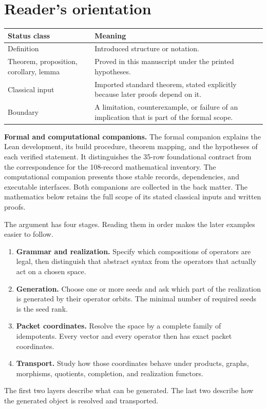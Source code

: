 \section*{Reader's orientation}
\begin{center}
\begin{tabularx}{0.96\textwidth}{@{}lY@{}}
\toprule
\textbf{Status class} & \textbf{Meaning}\\
\midrule
Definition & Introduced structure or notation.\\
Theorem, proposition, corollary, lemma & Proved in this manuscript under the printed hypotheses.\\
Classical input & Imported standard theorem, stated explicitly because later proofs depend on it.\\
Boundary & A limitation, counterexample, or failure of an implication that is part of the formal scope.\\
\bottomrule
\end{tabularx}
\end{center}

\noindent\textbf{Formal and computational companions.} The formal companion explains the Lean development, its build procedure, theorem mapping, and the hypotheses of each verified statement. It distinguishes the 35-row foundational contract from the correspondence for the 108-record mathematical inventory. The computational companion presents those stable records, dependencies, and executable interfaces. Both companions are collected in the back matter. The mathematics below retains the full scope of its stated classical inputs and written proofs.


\begin{readerroadmap}
The argument has four stages. Reading them in order makes the later examples easier to follow.
\begin{enumerate}
\item \textbf{Grammar and realization.}  Specify which compositions of operators are legal, then distinguish that abstract syntax from the operators that actually act on a chosen space.
\item \textbf{Generation.}  Choose one or more seeds and ask which part of the realization is generated by their operator orbits.  The minimal number of required seeds is the seed rank.
\item \textbf{Packet coordinates.}  Resolve the space by a complete family of idempotents.  Every vector and every operator then has exact packet coordinates.
\item \textbf{Transport.}  Study how those coordinates behave under products, graphs, morphisms, quotients, completion, and realization functors.
\end{enumerate}
The first two layers describe what can be generated.  The last two describe how the generated object is resolved and transported.
\end{readerroadmap}

